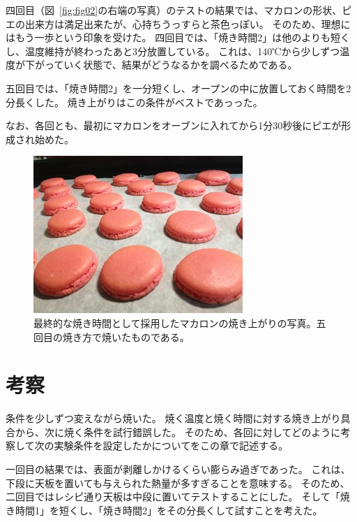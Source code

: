 \documentclass[uplatex,dvipdfmx,a4j,12pt]{jsarticle}
\begin{document}
四回目（図~\ref{fig:fig02}の右端の写真）のテストの結果では、マカロンの形状、ピエの出来方は満足出来たが、心持ちうっすらと茶色っぽい。 
そのため、理想にはもう一歩という印象を受けた。
四回目では、「焼き時間2」は他のよりも短くし、温度維持が終わったあと3分放置している。
これは、140℃から少しずつ温度が下がっていく状態で、結果がどうなるかを調べるためである。

五回目では、「焼き時間2」を一分短くし、オープンの中に放置しておく時間を2分長くした。
焼き上がりはこの条件がベストであっった。

なお、各回とも、最初にマカロンをオーブンに入れてから1分30秒後にピエが形成され始めた。

\begin{figure}[b]
    \centering
    \includegraphics[width=0.6\linewidth]{fig06.jpg}
    \caption{最終的な焼き時間として採用したマカロンの焼き上がりの写真。五回目の焼き方で焼いたものである。}
    \label{fig:fig06}
\end{figure}

\section{考察}

条件を少しずつ変えながら焼いた。
焼く温度と焼く時間に対する焼き上がり具合から、次に焼く条件を試行錯誤した。
そのため、各回に対してどのように考察して次の実験条件を設定したかについてをこの章で記述する。

一回目の結果では、表面が剥離しかけるくらい膨らみ過ぎであった。
これは、下段に天板を置いても与えられた熱量が多すぎることを意味する。
そのため、二回目ではレシピ通り天板は中段に置いてテストすることにした。
そして「焼き時間1」を短くし、「焼き時間2」をその分長くして試すことを考えた。
\end{document}
